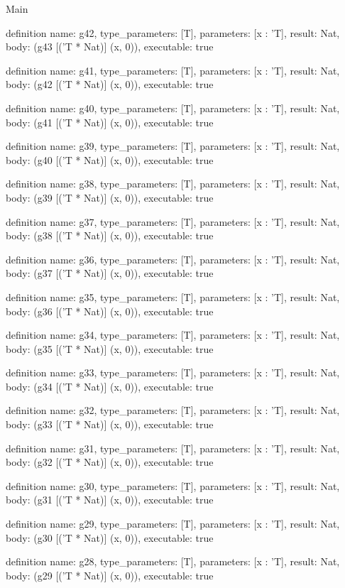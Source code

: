 \begin{lexlean}{Main}
\begin{semanticmodule}
definition{
  name: g42,
  type_parameters: [T],
  parameters: [x : 'T],
  result: Nat,
  body: (g43 [('T * Nat)] (x, 0)),
  executable: true
}

definition{
  name: g41,
  type_parameters: [T],
  parameters: [x : 'T],
  result: Nat,
  body: (g42 [('T * Nat)] (x, 0)),
  executable: true
}

definition{
  name: g40,
  type_parameters: [T],
  parameters: [x : 'T],
  result: Nat,
  body: (g41 [('T * Nat)] (x, 0)),
  executable: true
}

definition{
  name: g39,
  type_parameters: [T],
  parameters: [x : 'T],
  result: Nat,
  body: (g40 [('T * Nat)] (x, 0)),
  executable: true
}

definition{
  name: g38,
  type_parameters: [T],
  parameters: [x : 'T],
  result: Nat,
  body: (g39 [('T * Nat)] (x, 0)),
  executable: true
}

definition{
  name: g37,
  type_parameters: [T],
  parameters: [x : 'T],
  result: Nat,
  body: (g38 [('T * Nat)] (x, 0)),
  executable: true
}

definition{
  name: g36,
  type_parameters: [T],
  parameters: [x : 'T],
  result: Nat,
  body: (g37 [('T * Nat)] (x, 0)),
  executable: true
}

definition{
  name: g35,
  type_parameters: [T],
  parameters: [x : 'T],
  result: Nat,
  body: (g36 [('T * Nat)] (x, 0)),
  executable: true
}

definition{
  name: g34,
  type_parameters: [T],
  parameters: [x : 'T],
  result: Nat,
  body: (g35 [('T * Nat)] (x, 0)),
  executable: true
}

definition{
  name: g33,
  type_parameters: [T],
  parameters: [x : 'T],
  result: Nat,
  body: (g34 [('T * Nat)] (x, 0)),
  executable: true
}

definition{
  name: g32,
  type_parameters: [T],
  parameters: [x : 'T],
  result: Nat,
  body: (g33 [('T * Nat)] (x, 0)),
  executable: true
}

definition{
  name: g31,
  type_parameters: [T],
  parameters: [x : 'T],
  result: Nat,
  body: (g32 [('T * Nat)] (x, 0)),
  executable: true
}

definition{
  name: g30,
  type_parameters: [T],
  parameters: [x : 'T],
  result: Nat,
  body: (g31 [('T * Nat)] (x, 0)),
  executable: true
}

definition{
  name: g29,
  type_parameters: [T],
  parameters: [x : 'T],
  result: Nat,
  body: (g30 [('T * Nat)] (x, 0)),
  executable: true
}

definition{
  name: g28,
  type_parameters: [T],
  parameters: [x : 'T],
  result: Nat,
  body: (g29 [('T * Nat)] (x, 0)),
  executable: true
}


\end{semanticmodule}
\end{lexlean}
